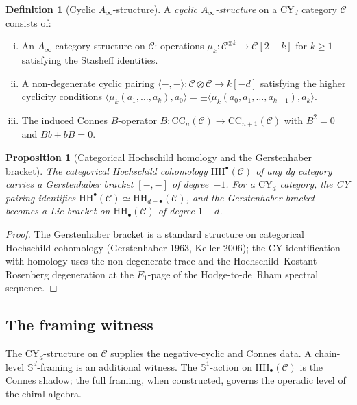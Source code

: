 \documentclass[11pt]{article}
\theoremstyle{plain}
\newtheorem{proposition}[theorem]{Proposition}
\theoremstyle{definition}
\newtheorem{definition}[theorem]{Definition}
\theoremstyle{remark}
\newcommand{\cC}{\mathcal{C}}
\newcommand{\bS}{\mathbb{S}}
\newcommand{\Ainf}{A_\infty}
\newcommand{\Sd}{\bS^d}
\newcommand{\HH}{\mathrm{HH}}
\newcommand{\CC}{\mathrm{CC}}
\newcommand{\CY}{\mathrm{CY}}
\begin{document}
\begin{definition}[Cyclic $\Ainf$-structure]
\label{def:v3-st-cyclic-ainf}
A \emph{cyclic $\Ainf$-structure} on a CY$_d$ category $\cC$
consists of:
\begin{enumerate}[(i)]
 \item An $\Ainf$-category structure on $\cC$: operations
 $\mu_k \colon \cC^{\otimes k} \to \cC[2-k]$ for $k \geq 1$
 satisfying the Stasheff identities.
 \item A non-degenerate cyclic pairing
 $\langle -, - \rangle \colon \cC \otimes \cC \to k[-d]$
 satisfying the higher cyclicity conditions
 $\langle \mu_k(a_1, \ldots, a_k), a_0 \rangle
 = \pm \langle \mu_k(a_0, a_1, \ldots, a_{k-1}), a_k \rangle$.
 \item The induced Connes $B$-operator $B \colon \CC_n(\cC) \to
 \CC_{n+1}(\cC)$ with $B^2 = 0$ and $Bb + bB = 0$.
\end{enumerate}
\end{definition}

\begin{proposition}[Categorical Hochschild homology and the Gerstenhaber bracket]
\label{prop:v3-st-gerstenhaber}
The categorical Hochschild cohomology $\HH^\bullet(\cC)$ of any dg category
carries a Gerstenhaber bracket $[-,-]$ of degree~$-1$.  For a
$\CY_d$ category, the CY pairing identifies
$\HH^\bullet(\cC) \simeq \HH_{d - \bullet}(\cC)$, and the
Gerstenhaber bracket becomes a Lie bracket on $\HH_\bullet(\cC)$
of degree $1 - d$.
\end{proposition}

\begin{proof}
The Gerstenhaber bracket is a standard structure on categorical Hochschild
cohomology (Gerstenhaber 1963, Keller 2006); the CY identification
with homology uses the non-degenerate trace and the
Hochschild--Kostant--Rosenberg degeneration at the $E_1$-page of
the Hodge-to-de~Rham spectral sequence.
\end{proof}

\subsection{The framing witness}

The CY$_d$-structure on $\cC$ supplies the negative-cyclic and
Connes data.  A chain-level $\Sd$-framing is an additional witness.
The $\bS^1$-action on $\HH_\bullet(\cC)$ is the Connes shadow; the
full framing, when constructed, governs the operadic level of the
chiral algebra.
\end{document}
